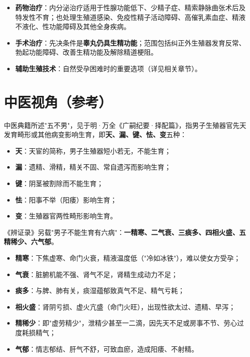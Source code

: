 \documentclass[12pt,UTF8,openany]{ctexbook}
\begin{document}
\begin{itemize}[leftmargin=2em,itemsep=0.3em]
  \item \textbf{药物治疗}：内分泌治疗适用于性腺功能低下、少精子症、精索静脉曲张术后及特发性不育；也处理生殖道感染、免疫性精子活动障碍、高催乳素血症、精液不液化、性功能障碍及其他全身疾病。
  \item \textbf{手术治疗}：先决条件是\textbf{睾丸仍具生精功能}；范围包括纠正外生殖器发育反常、勃起功能障碍、改善生精功能及解除精道梗阻。
  \item \textbf{辅助生殖技术}：自然受孕困难时的重要选项（详见相关章节）。
\end{itemize}

\section{中医视角（参考）}

中医典籍所述"五不男"，见于明·万全《广嗣纪要·择配篇》，指男子生殖器官先天发育畸形或其他病变影响生育，即\textbf{天、漏、键、怯、变}五种：

\begin{itemize}[leftmargin=2em,itemsep=0.3em]
  \item \textbf{天}：天宦的简称，男子生殖器短小若无，不能生育；
  \item \textbf{漏}：遗精、滑精，精关不固、常自遗泻而影响生育；
  \item \textbf{键}：阴茎被割除而不能生育；
  \item \textbf{怯}：阳事不举（阳痿）影响生育；
  \item \textbf{变}：生殖器官两性畸形影响生育。
\end{itemize}

《辨证录》另载"男子不能生育有六病"：\textbf{一精寒、二气衰、三痰多、四相火盛、五精稀少、六气郁}。

\begin{itemize}[leftmargin=2em,itemsep=0.3em]
  \item \textbf{精寒}：下焦虚寒、命门火衰，精液温度低（"冷如冰铁"），难以使女方受孕；
  \item \textbf{气衰}：脏腑机能不强、肾气不足，肾精生成动力不足；
  \item \textbf{痰多}：与脾、肺有关，痰湿蕴郁致真气不足、精气亏耗；
  \item \textbf{相火盛}：肾阴亏损、虚火亢盛（命门火旺），出现性欲太过、遗精、早泻；
  \item \textbf{精稀少}：即"虚劳精少"，泄精少甚至一二滴，因先天不足或房事不节、劳心过度耗损精气；
  \item \textbf{气郁}：情志郁结、肝气不舒，可致血瘀，造成阳痿、不射精。
\end{itemize}
\end{document}
